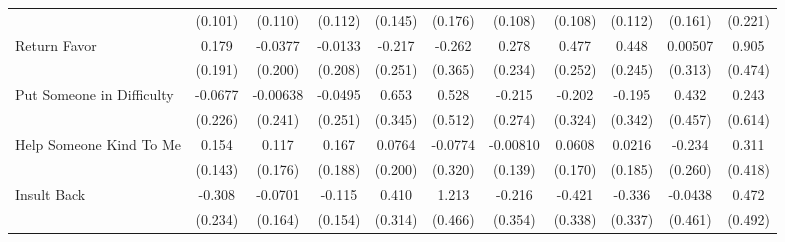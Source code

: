 {\begin{tabular}{l*{10}{c}}
            &     (0.101)         &     (0.110)         &     (0.112)         &     (0.145)         &     (0.176)         &     (0.108)         &     (0.108)         &     (0.112)         &     (0.161)         &     (0.221)         \\
\addlinespace
Return Favor&       0.179         &     -0.0377         &     -0.0133         &      -0.217         &      -0.262         &       0.278         &       0.477         &       0.448         &     0.00507         &       0.905         \\
            &     (0.191)         &     (0.200)         &     (0.208)         &     (0.251)         &     (0.365)         &     (0.234)         &     (0.252)         &     (0.245)         &     (0.313)         &     (0.474)         \\
\addlinespace
Put Someone in Difficulty&     -0.0677         &    -0.00638         &     -0.0495         &       0.653         &       0.528         &      -0.215         &      -0.202         &      -0.195         &       0.432         &       0.243         \\
            &     (0.226)         &     (0.241)         &     (0.251)         &     (0.345)         &     (0.512)         &     (0.274)         &     (0.324)         &     (0.342)         &     (0.457)         &     (0.614)         \\
\addlinespace
Help Someone Kind To Me&       0.154         &       0.117         &       0.167         &      0.0764         &     -0.0774         &    -0.00810         &      0.0608         &      0.0216         &      -0.234         &       0.311         \\
            &     (0.143)         &     (0.176)         &     (0.188)         &     (0.200)         &     (0.320)         &     (0.139)         &     (0.170)         &     (0.185)         &     (0.260)         &     (0.418)         \\
\addlinespace
Insult Back &      -0.308         &     -0.0701         &      -0.115         &       0.410         &       1.213\sym{**} &      -0.216         &      -0.421         &      -0.336         &     -0.0438         &       0.472         \\
            &     (0.234)         &     (0.164)         &     (0.154)         &     (0.314)         &     (0.466)         &     (0.354)         &     (0.338)         &     (0.337)         &     (0.461)         &     (0.492)         \\
\bottomrule
\end{tabular}
}

